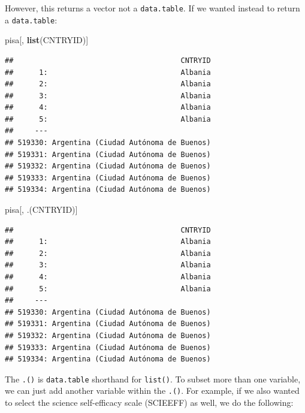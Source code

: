 \documentclass[]{book}
\newenvironment{Shaded}{\begin{snugshade}}{\end{snugshade}}
\newcommand{\KeywordTok}[1]{\textcolor[rgb]{0.13,0.29,0.53}{\textbf{#1}}}
\newcommand{\NormalTok}[1]{#1}
\begin{document}
However, this returns a vector not a \texttt{data.table}. If we wanted instead to return a \texttt{data.table}:

\begin{Shaded}
\begin{Highlighting}[]
\NormalTok{pisa[, }
     \KeywordTok{list}\NormalTok{(CNTRYID)]}
\end{Highlighting}
\end{Shaded}

\begin{verbatim}
##                                       CNTRYID
##      1:                               Albania
##      2:                               Albania
##      3:                               Albania
##      4:                               Albania
##      5:                               Albania
##     ---                                      
## 519330: Argentina (Ciudad Autónoma de Buenos)
## 519331: Argentina (Ciudad Autónoma de Buenos)
## 519332: Argentina (Ciudad Autónoma de Buenos)
## 519333: Argentina (Ciudad Autónoma de Buenos)
## 519334: Argentina (Ciudad Autónoma de Buenos)
\end{verbatim}

\begin{Shaded}
\begin{Highlighting}[]
\NormalTok{pisa[,}
\NormalTok{     .(CNTRYID)]}
\end{Highlighting}
\end{Shaded}

\begin{verbatim}
##                                       CNTRYID
##      1:                               Albania
##      2:                               Albania
##      3:                               Albania
##      4:                               Albania
##      5:                               Albania
##     ---                                      
## 519330: Argentina (Ciudad Autónoma de Buenos)
## 519331: Argentina (Ciudad Autónoma de Buenos)
## 519332: Argentina (Ciudad Autónoma de Buenos)
## 519333: Argentina (Ciudad Autónoma de Buenos)
## 519334: Argentina (Ciudad Autónoma de Buenos)
\end{verbatim}

The \texttt{.()} is \texttt{data.table} shorthand for \texttt{list()}. To subset more than one variable, we can just add another variable within the \texttt{.()}. For example, if we also wanted to select the science self-efficacy scale (SCIEEFF) as well, we do the following:
\end{document}
